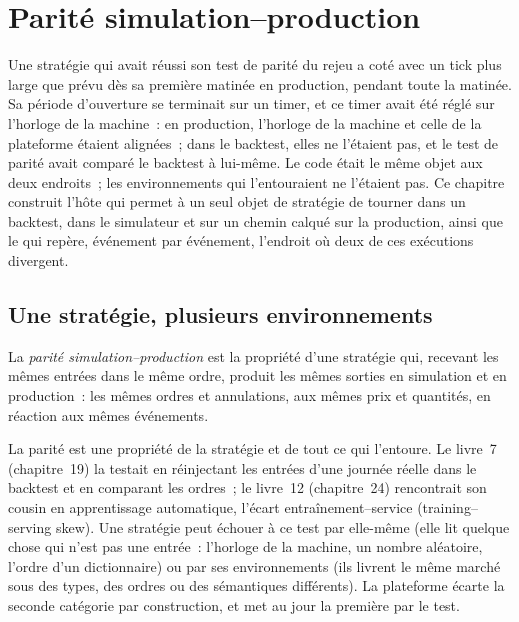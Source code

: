\chapter{Parité simulation--production}\label{ch:pl:simulation-production-parity}

Une stratégie qui avait réussi son test de parité du rejeu a coté avec un tick plus large que prévu dès sa première matinée en production, pendant toute la matinée.
Sa période d'ouverture se terminait sur un timer, et ce timer avait été réglé sur l'horloge de la machine~: en production, l'horloge de la
machine et celle de la plateforme étaient alignées~; dans le backtest, elles ne l'étaient pas, et le test de parité avait comparé le backtest à lui-même.
Le code était le même objet aux deux endroits~; les environnements qui l'entouraient ne l'étaient pas. Ce chapitre construit l'hôte qui permet à un seul objet de stratégie de tourner dans un
backtest, dans le simulateur et sur un chemin calqué sur la production, ainsi que le  qui repère, événement par événement, l'endroit où deux de ces exécutions divergent.

\section{Une stratégie, plusieurs environnements}

\begin{definition}\label{def:pl:simulation-production-parity:parity}
La \emph{parité simulation--production} est la propriété d'une stratégie qui, recevant les mêmes entrées
dans le même ordre, produit les mêmes sorties en simulation et en production~: les mêmes ordres et annulations, aux mêmes prix et
quantités, en réaction aux mêmes événements.
\end{definition}

La parité est une propriété de la stratégie et de tout ce qui l'entoure. Le livre~7 (chapitre~19) la testait en réinjectant les entrées d'une journée réelle
dans le backtest et en comparant les ordres~; le livre~12 (chapitre~24) rencontrait son cousin en apprentissage automatique, l'écart entraînement--service (training--serving skew). Une stratégie peut
échouer à ce test par elle-même (elle lit quelque chose qui n'est pas une entrée~: l'horloge de la machine, un nombre aléatoire, l'ordre d'un dictionnaire) ou par
ses environnements (ils livrent le même marché sous des types, des ordres ou des sémantiques différents). La plateforme écarte la seconde catégorie par
construction, et met au jour la première par le test.

